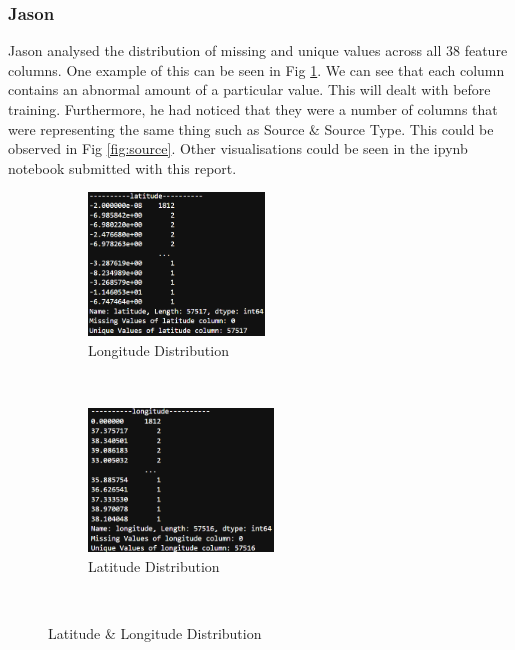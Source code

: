 \documentclass[conference]{IEEEtran}
\begin{document}
\subsubsection{Jason}

Jason analysed the distribution of missing and unique values across all 38 feature columns. One example of this can be seen in Fig \ref{fig:lat_long_distribution}. We can see that each column contains an abnormal amount of a particular value. This will dealt with before training. Furthermore, he had noticed that they were a number of columns that were representing the same thing such as Source \& Source Type. This could be observed in Fig \ref{fig:source}. Other visualisations could be seen in the ipynb notebook submitted with this report.

\begin{figure}[t]
    \centering
    \begin{subfigure}[t]{0.3\textwidth}
      \centering
      \includegraphics[height=1.5in]{figures/jason_latitude.png}
      \caption{Longitude Distribution}
    \end{subfigure}%
    ~
    \begin{subfigure}[t]{0.3\textwidth}
      \centering
      \includegraphics[height=1.5in]{figures/jason_longitude.png}
      \caption{Latitude Distribution}
    \end{subfigure}
    ~
    \caption{Latitude \& Longitude Distribution}
    \label{fig:lat_long_distribution}
\end{figure}
\end{document}
